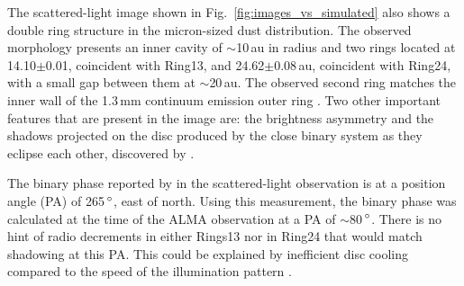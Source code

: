 \documentclass[letters,usenatbib,times]{mnras}
\begin{document}

The scattered-light image shown in Fig.~\ref{fig:images_vs_simulated} also shows a double ring structure in the micron-sized dust distribution. The observed morphology presents an inner cavity of $\sim$10\,au in radius and two rings located at 14.10$\pm$0.01, coincident with Ring13, and 24.62$\pm$0.08\,au, coincident with Ring24, with a small gap between them at $\sim$20\,au. The observed second ring matches the inner wall of the 1.3\,mm continuum emission outer ring \citep{Ru_z_Rodr_guez_2019}. Two other important features that are present in the image are: the brightness asymmetry and the shadows projected on the disc produced by the close binary system as they eclipse each other, discovered by \citet{dOrazi}.

The binary phase reported by \citet{dOrazi} in the scattered-light observation is at a position angle (PA) of 265\,$\hbox{$^\circ$}$, east of north. Using this measurement, the binary phase was calculated at the time of the ALMA observation at a PA of $\sim$80\,$\hbox{$^\circ$}$. There is no hint of radio decrements in either Rings13 nor in Ring24 that would match shadowing at this PA. This could be explained by inefficient disc cooling compared to the speed of the illumination pattern \citep[see ][ for estimates of this cooling timescale]{Casassus2019MNRAS.486L..58C}. 
\end{document}
